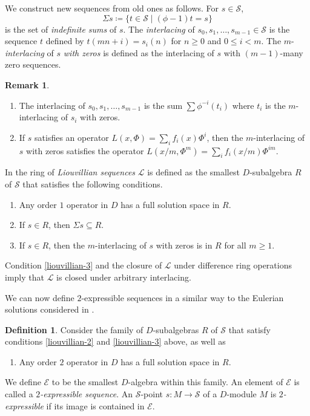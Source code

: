 \documentclass[11pt,reqno]{amsart}
\theoremstyle{definition}
\newtheorem{definition}[theorem]{Definition}
\newtheorem{remark}[theorem]{Remark}
\begin{document}
We construct new sequences from old ones as follows. For $s\in \mathcal{S}$,
\[
    \Sigma s\coloneqq \lbrace t\in \mathcal{S}\mid (\phi-1)t=s\rbrace
\]
is the set of \emph{indefinite sums} of $s$. 
The \emph{interlacing} of $s_{0},s_{1},\dots,s_{m-1}\in \mathcal{S}$ is the sequence $t$ defined by $t(mn+i)=s_{i}(n)$ for $n\ge 0$ and $0\le i<m$. 
The $m$-\emph{interlacing} of $s$ \emph{with zeros} is defined as the interlacing of $s$ with $(m-1)$-many zero sequences. 

\begin{remark}\hfill
    \begin{enumerate}
        \item The interlacing of $s_{0},s_{1},\dots,s_{m-1}$ is the sum %
        $\sum \phi^{-i}(t_i)$
        where $t_{i}$ is the $m$-interlacing of $s_{i}$ with zeros. 
        \item If $s$ satisfies an operator $L(x,\Phi)=\sum_{i}f_{i}(x)\Phi^{i}$, then the $m$-interlacing of $s$ with zeros satisfies the operator $L(x/m,\Phi^{m})=\sum_{i}f_{i}(x/m)\Phi^{im}$.
    \end{enumerate}
\end{remark}

In \cite[Definition 3.3]{hendricks1999solving} the ring of \emph{Liouvillian sequences} $\mathcal{L}$ is defined as the smallest $D$-subalgebra
$R$ of $\mathcal{S}$ that satisfies the following conditions.
\begin{enumerate}
    \item\label{liouvillian-1} Any order $1$ operator in $D$ has a full solution space in $R$. 
    \item\label{liouvillian-2} If $s\in R$, then $\Sigma s\subseteq R$.
    \item\label{liouvillian-3} If $s\in R$, then the $m$-interlacing of $s$ with zeros is in $R$ for all $m\ge 1$.
\end{enumerate}

Condition \eqref{liouvillian-3} and the closure of $\mathcal{L}$ under difference ring operations imply that $\mathcal{L}$ is closed under arbitrary interlacing.

We can now define $2$-expressible sequences in a similar way to the Eulerian solutions considered in \cite{singer1985solving}.

\begin{definition}
\label{def:eulerian}
    Consider the family of $D$-subalgebras $R$ of $\mathcal{S}$ that satisfy conditions \eqref{liouvillian-2} and \eqref{liouvillian-3} above, as well as
    \begin{enumerate}[resume]
        \item\label{liouvillian-4} Any order $2$ operator in $D$ has a full solution space in $R$. 
    \end{enumerate}
    We define $\mathcal{E}$ to be the smallest $D$-algebra within this family.
    An element of $\mathcal{E}$ is called a \emph{$2$-expressible sequence}.
    An $\mathcal{S}$-point $s\colon M\to \mathcal{S}$ of a $D$-module $M$ is \emph{$2$-expressible} if its image is contained in $\mathcal{E}$.
\end{definition}
\end{document}
